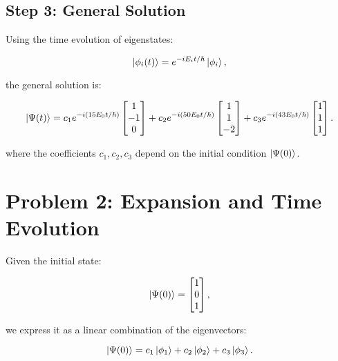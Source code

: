 \documentclass[12pt]{article}
\begin{document}
\subsection*{Step 3: General Solution}
Using the time evolution of eigenstates:

\begin{equation}
    \ket{\phi_i (t)} = e^{-iE_i t / \hbar} \ket{\phi_i},
\end{equation}

the general solution is:

\begin{equation}
    \ket{\Psi(t)} = c_1 e^{-i (15E_0 t / \hbar)} \begin{bmatrix} 1 \\ -1 \\ 0 \end{bmatrix}
    + c_2 e^{-i (50E_0 t / \hbar)} \begin{bmatrix} 1 \\ 1 \\ -2 \end{bmatrix}
    + c_3 e^{-i (43E_0 t / \hbar)} \begin{bmatrix} 1 \\ 1 \\ 1 \end{bmatrix}.
\end{equation}

where the coefficients \( c_1, c_2, c_3 \) depend on the initial condition \( \ket{\Psi(0)} \).







\section*{Problem 2: Expansion and Time Evolution}

Given the initial state:

\begin{equation}
    \ket{\Psi(0)} = \begin{bmatrix} 1 \\ 0 \\ 1 \end{bmatrix},
\end{equation}

we express it as a linear combination of the eigenvectors:

\begin{equation}
    \ket{\Psi(0)} = c_1 \ket{\phi_1} + c_2 \ket{\phi_2} + c_3 \ket{\phi_3}.
\end{equation}
\end{document}
